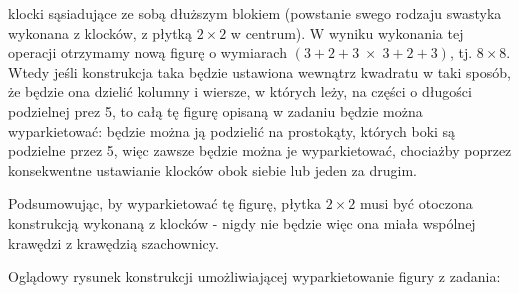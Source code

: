 \documentclass[11pt]{article}
\begin{document}
\begin{justify}
klocki sąsiadujące ze sobą dłuższym blokiem (powstanie swego rodzaju swastyka wykonana z klocków, z płytką $2 \times 2$ w centrum). W wyniku wykonania tej operacji otrzymamy
nową figurę o wymiarach $(3+2+3 \;\times\;  3+2+3)$, tj. $8 \times 8$. Wtedy jeśli konstrukcja taka będzie ustawiona wewnątrz kwadratu w taki sposób, że będzie ona dzielić kolumny i wiersze,
w których leży, na części o długości podzielnej prez 5, to całą tę figurę opisaną w zadaniu będzie można wyparkietować: będzie można ją podzielić na prostokąty, których boki są podzielne przez 5, więc zawsze będzie można je wyparkietować, chociażby poprzez konsekwentne ustawianie klocków obok siebie lub jeden za drugim.

Podsumowując, by wyparkietować tę figurę, płytka $2 \times 2$ musi być otoczona konstrukcją wykonaną z klocków - nigdy nie będzie więc ona miała wspólnej krawędzi z krawędzią szachownicy.

Oglądowy rysunek konstrukcji umożliwiającej wyparkietowanie figury z zadania: \linebreak
{}
\end{justify}
\end{document}
